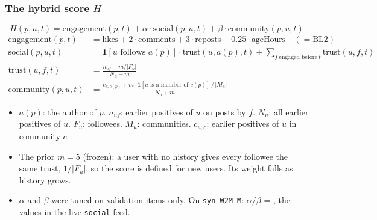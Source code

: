 \documentclass[aspectratio=169,11pt]{beamer}
\begin{document}
\begin{frame}
  \frametitle{The hybrid score $H$}
  \small
  \[ H(p,u,t) = \mathrm{engagement}(p,t) + \alpha \cdot \mathrm{social}(p,u,t) + \beta \cdot \mathrm{community}(p,u,t) \]
  \vspace{-4mm}
  \begin{align*}
    \mathrm{engagement}(p,t) &= \text{likes} + 2\cdot\text{comments} + 3\cdot\text{reposts} - 0.25\cdot\text{ageHours} \quad(=\text{BL2})\\
    \mathrm{social}(p,u,t) &= \mathbf{1}[u \text{ follows } a(p)]\cdot\mathrm{trust}(u,a(p),t) + \sum_{f\ \text{engaged before}\ t}\mathrm{trust}(u,f,t)\\
    \mathrm{trust}(u,f,t) &= \frac{n_{uf} + m/|F_u|}{N_u + m}\\
    \mathrm{community}(p,u,t) &= \frac{c_{u,c(p)} + m\cdot\mathbf{1}[u \text{ is a member of } c(p)]\,/\,|M_u|}{N_u + m}
  \end{align*}
  \vspace{-4mm}
  \begin{itemize}\footnotesize
    \item $a(p)$: the author of $p$. $n_{uf}$: earlier positives of $u$ on posts by $f$. $N_u$: all earlier positives of $u$. $F_u$: followees. $M_u$: communities. $c_{u,c}$: earlier positives of $u$ in community $c$.
    \item The prior $m = 5$ (frozen): a user with no history gives every followee the same trust, $1/|F_u|$, so the score is defined for new users. Its weight falls as history grows.
    \item $\alpha$ and $\beta$ were tuned on validation items only. On \texttt{syn-W2M-M}: $\alpha / \beta$ = \tuneWTwoMHChosen{}, the values in the live \texttt{social} feed.
  \end{itemize}
\end{frame}
\end{document}
